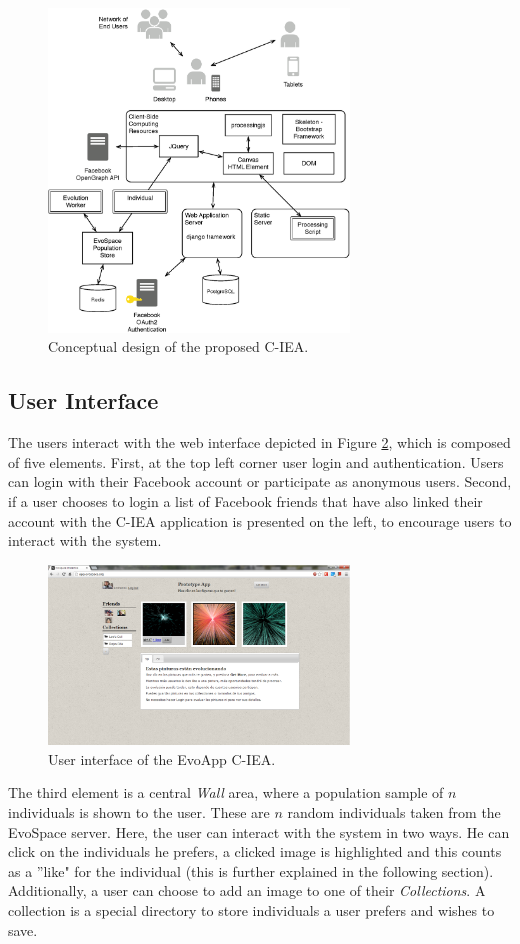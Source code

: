 \documentclass{llncs}
\begin{document}
\begin{figure}[t]
    \centering
        \includegraphics[width=8cm]{arq.eps}
    \caption{Conceptual design of the proposed C-IEA.}
    \label{fig:CIE}
\end{figure}




\subsection{User Interface}
The users interact with the web interface depicted in Figure \ref{fig:web}, which is composed of five elements.
First, at the top left corner user login and authentication.
Users can login with their Facebook account or participate as anonymous users.
Second, if a user chooses to login a list of Facebook friends that have also linked their account with the C-IEA application is presented on the left,
to encourage users to interact with the system.

\begin{figure}[t]
    \centering
        \includegraphics[width=8cm]{EvoApp.eps}
    \caption{User interface of the EvoApp C-IEA.}
    \label{fig:web}
\end{figure}

The third element is a central \emph{ Wall } area, where a population sample of $n$ individuals is shown to the user.
These are $n$ random individuals taken from the EvoSpace server.
Here, the user can interact with the system in two ways.
He can click on the individuals he prefers, a clicked image is highlighted and this counts as a ''like" for the individual
(this is further explained in the following section).
Additionally, a user can choose to add an image to one of their \emph{Collections}.
A collection is a special directory to store individuals a user prefers and wishes to save.
\end{document}
